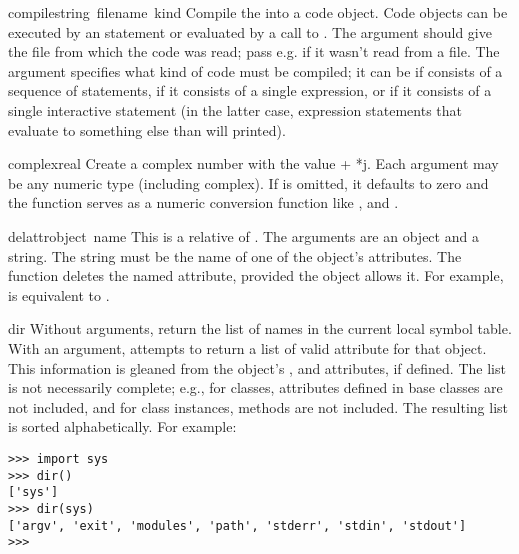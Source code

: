 \begin{funcdesc}{compile}{string\, filename\, kind}
  Compile the  into a code object.  Code objects can be
  executed by an  statement or evaluated by a call to
  .  The  argument should
  give the file from which the code was read; pass e.g. 
  if it wasn't read from a file.  The  argument specifies
  what kind of code must be compiled; it can be  if
   consists of a sequence of statements, 
  if it consists of a single expression, or  if
  it consists of a single interactive statement (in the latter case,
  expression statements that evaluate to something else than
   will printed).
\end{funcdesc}

\begin{funcdesc}{complex}{real}
  Create a complex number with the value  + *j.
  Each argument may be any numeric type (including complex).
  If  is omitted, it defaults to zero and the function
  serves as a numeric conversion function like , 
  and .
\end{funcdesc}

\begin{funcdesc}{delattr}{object\, name}
  This is a relative of .  The arguments are an
  object and a string.  The string must be the name
  of one of the object's attributes.  The function deletes
  the named attribute, provided the object allows it.  For example,
   is equivalent to
  .
\end{funcdesc}

\begin{funcdesc}{dir}{}
  Without arguments, return the list of names in the current local
  symbol table.  With an argument, attempts to return a list of valid
  attribute for that object.  This information is gleaned from the
  object's ,  and 
  attributes, if defined.  The list is not necessarily complete; e.g.,
  for classes, attributes defined in base classes are not included,
  and for class instances, methods are not included.
  The resulting list is sorted alphabetically.  For example:

\bcode\begin{verbatim}
>>> import sys
>>> dir()
['sys']
>>> dir(sys)
['argv', 'exit', 'modules', 'path', 'stderr', 'stdin', 'stdout']
>>> 
\end{verbatim}\ecode
\end{funcdesc}

